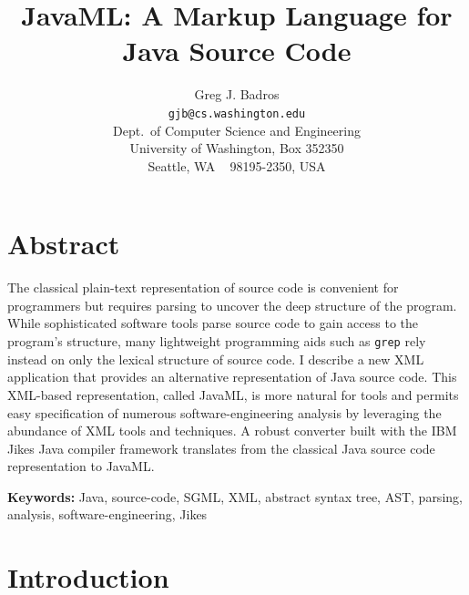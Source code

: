 \documentclass{article}
\begin{document}

\newcommand{\smtexttt}[1]{{\small\texttt{#1}}}
\newenvironment{smverbatim}{\small \begin{verbatim}}{\end{verbatim}}
\newenvironment{shellcommand}{\begin{verbatim}}{\end{verbatim}}
\newenvironment{shelloutput}{\begin{verbatim}}{\end{verbatim}}

\title{JavaML: A Markup Language for Java Source Code}
\author{Greg J. Badros \\
\smtexttt{gjb@cs.washington.edu}\\
Dept.\ of Computer Science and Engineering\\
University of Washington, Box 352350\\
Seattle, WA ~ 98195-2350, USA}
\date{}

\thispagestyle{empty}
\pagestyle{empty}

\maketitle

\section*{Abstract}
The classical plain-text representation of source code is convenient for
programmers but requires parsing to uncover the deep structure of the
program.  While sophisticated software tools parse source code to gain
access to the program's structure, many lightweight programming aids
such as \smtexttt{grep} rely instead on only the lexical structure of
source code.  I describe a new XML application that provides an
alternative representation of Java source code. This XML-based
representation, called JavaML, is more natural for tools and permits
easy specification of numerous software-engineering analysis by
leveraging the abundance of XML tools and techniques.  A robust
converter built with the IBM Jikes Java compiler framework translates
from the classical Java source code representation to JavaML.

\vspace*{.3cm} \noindent \textbf{Keywords:}
Java, source-code, SGML, XML, abstract syntax tree, AST, parsing,
analysis, software-engineering, Jikes

\section{Introduction}
\label{sec-intro}
\end{document}
